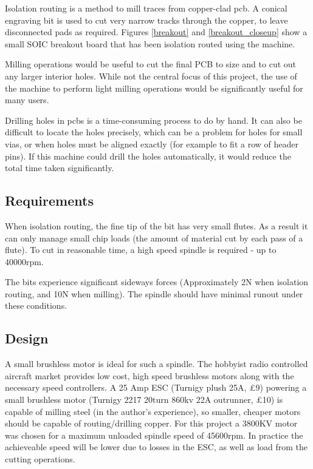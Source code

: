 Isolation routing is a method to mill traces from copper-clad pcb. A conical engraving bit is used to cut very narrow tracks through
the copper, to leave disconnected pads as required. Figures \ref{breakout} and \ref{breakout_closeup} show a small SOIC breakout board that has been isolation routed using the machine. 


Milling operations would be useful to cut the final PCB to size and to
cut out any larger interior holes. While not the central focus of this
project, the use of the machine to perform light milling operations
would be significantly useful for many users.

Drilling holes in pcbs is a time-consuming process to do by hand. It can also be difficult to locate the holes precisely, which can be a problem
for holes for small vias, or when holes must be aligned exactly (for example to fit a row of header pins). If this machine could drill the holes automatically,
it would reduce the total time taken significantly.

\subsection{Requirements}
When isolation routing, the fine tip of the bit has very small flutes. As a result it can only manage
small chip loads (the amount of material cut by each pass of a flute). To cut in reasonable time, a high speed spindle is required - up to 40000rpm.

The bits experience significant sideways forces (Approximately 2N when isolation routing, and 10N when milling). The spindle
should have minimal runout under these conditions.

\subsection{Design}
A small brushless motor is ideal for such a spindle. The hobbyist radio
controlled aircraft market provides low cost, high speed brushless motors
along with the necessary speed controllers. A 25 Amp \gls{ESC} 
(Turnigy plush 25A, \pounds 9) powering a small brushless motor 
(Turnigy 2217 20turn 860kv 22A outrunner, \pounds 10) is capable of milling
steel (in the author's experience), so smaller, cheaper motors should be 
capable of routing/drilling copper. For this project a 3800KV motor was
chosen for a maximum unloaded spindle speed of 45600rpm. In practice the
achieveable speed will be lower due to losses in the ESC, as well as load
from the cutting operations.

